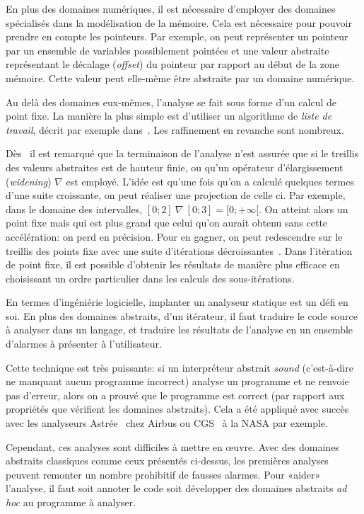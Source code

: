En plus des domaines numériques, il est nécessaire d'employer des domaines
spécialisés dans la modélisation de la mémoire. Cela est nécessaire pour pouvoir
prendre en compte les pointeurs. Par exemple, on peut représenter un pointeur
par un ensemble de variables possiblement pointées et une valeur abstraite
représentant le décalage (\emph{offset}) du pointeur par rapport au début de la
zone mémoire. Cette valeur peut elle-même être abstraite par un domaine
numérique.

Au delà des domaines eux-mêmes, l'analyse se fait sous forme d'un calcul de
point fixe. La manière la plus simple est d'utiliser un algorithme de
\emph{liste de travail}, décrit par exemple dans~\cite{tapsoft95}. Les
raffinement en revanche sont nombreux.

Dès~\cite{Cousot77} il est remarqué que la terminaison de l'analyse n'est
assurée que si le treillis des valeurs abstraites est de hauteur finie, ou qu'un
opérateur d'élargissement (\emph{widening}) $\nabla$ est employé. L'idée est
qu'une fois qu'on a calculé quelques termes d'une suite croissante, on peut
réaliser une projection de celle ci. Par exemple, dans le domaine des
intervalles, $[0;2]~\nabla~[0;3] = [0;+\infty[$. On atteint alors un point fixe
mais qui est plus grand que celui qu'on aurait obtenu sans cette accélération:
on perd en précision. Pour en gagner, on peut redescendre sur le treillis des
points fixe avec une suite d'itérations décroissantes~\cite{granger}. Dans
l'itération de point fixe, il est possible d'obtenir les résultats de manière
plus efficace en choisissant un ordre particulier dans les calculs des
sous-itérations\cite{policy}.

En termes d'ingéniérie logicielle, implanter un analyseur statique est un défi
en soi. En plus des domaines abstraits, d'un itérateur, il faut traduire le code
source à analyser dans un langage, et traduire les résultats de l'analyse en un
ensemble d'alarmes à présenter à l'utilisateur.

Cette technique est très puissante: si un interpréteur abstrait \emph{sound}
(c'est-à-dire ne manquant aucun programme incorrect) analyse un programme et ne renvoie
pas d'erreur, alors on a prouvé que le programme est correct (par rapport aux
propriétés que vérifient les domaines abstraits). Cela a été appliqué avec
succès avec les analyseurs Astrée~\cite{Astree04,Astree05,AstreeScale} chez
Airbus ou CGS~\cite{cgs} à la NASA par exemple.

Cependant, ces analyses sont difficiles à mettre en œuvre. Avec des domaines
abstraits classiques comme ceux présentés ci-dessus, les premières analyses
peuvent remonter un nombre prohibitif de fausses alarmes. Pour «aider»
l'analyse, il faut soit annoter le code soit développer des domaines abstraits
\emph{ad hoc} au programme à analyser.

